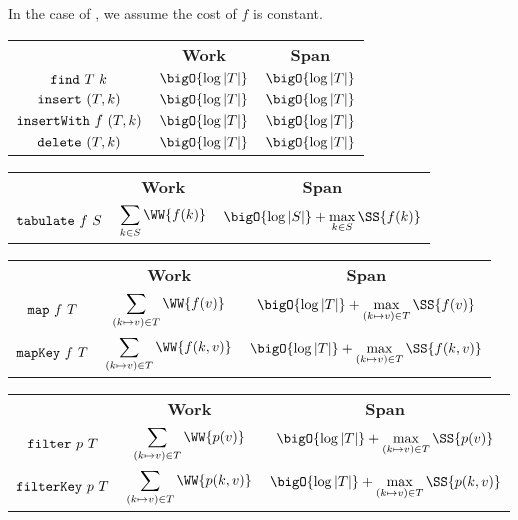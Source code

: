 \begin{costspec}
In the case of , we assume the cost of $f$ is constant.
\begin{tabular}{c|c|c}
& \textbf{Work} & \textbf{Span} \\
$\texttt{find}~T~k$ & $\bigO{\log|T|}$ & $\bigO{\log|T|}$ \\
$\texttt{insert}~(T, k)$ & $\bigO{\log|T|}$ & $\bigO{\log|T|}$ \\
$\texttt{insertWith}~f~(T, k)$ & $\bigO{\log|T|}$ & $\bigO{\log|T|}$ \\
$\texttt{delete}~(T, k)$ & $\bigO{\log|T|}$ & $\bigO{\log|T|}$
\end{tabular}
\end{costspec}

\begin{costspec}[Tabulate]
\begin{tabular}{c|c|c}
& \textbf{Work} & \textbf{Span} \\
$\texttt{tabulate}~f~S$ &
$\displaystyle\sum_{k \in S} \WW {f(k)}$ &
$\bigO{\log|S|} + \displaystyle\max_{k \in S} \SS{f(k)}$
\end{tabular}
\end{costspec}

\begin{costspec}[Map]
\begin{tabular}{c|c|c}
& \textbf{Work} & \textbf{Span} \\
$\texttt{map}~f~T$ &
$\displaystyle\sum_{(k \mapsto v) \in T} \WW {f(v)}$ &
$\bigO{\log|T|} + \displaystyle\max_{(k \mapsto v) \in T} \SS{f(v)}$
\\
$\texttt{mapKey}~f~T$ &
$\displaystyle\sum_{(k \mapsto v) \in T} \WW {f(k,v)}$ &
$\bigO{\log|T|} + \displaystyle\max_{(k \mapsto v) \in T} \SS{f(k,v)}$
\end{tabular}
\end{costspec}

\begin{costspec}[Filter]
\begin{tabular}{c|c|c}
& \textbf{Work} & \textbf{Span} \\
$\texttt{filter}~p~T$ &
$\displaystyle\sum_{(k \mapsto v) \in T} \WW {p(v)}$ &
$\bigO{\log|T|} + \displaystyle\max_{(k \mapsto v) \in T} \SS{p(v)}$
\\
$\texttt{filterKey}~p~T$ &
$\displaystyle\sum_{(k \mapsto v) \in T} \WW {p(k,v)}$ &
$\bigO{\log|T|} + \displaystyle\max_{(k \mapsto v) \in T} \SS{p(k,v)}$
\end{tabular}
\end{costspec}

